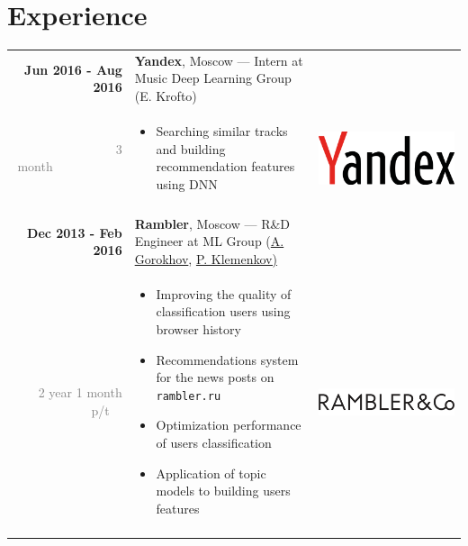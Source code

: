 \documentclass[a4paper,10pt]{article} %
\begin{document}
\section{Experience}

\begin{tabular}{r|p{11.5cm}c}
\textbf{Jun 2016 - Aug 2016}
 & \textbf{Yandex}, Moscow --- Intern at Music Deep Learning Group \footnotesize{(E. Krofto)} \\ 
\textcolor{gray}{3 month}~~~~~~~~~~~&  \footnotesize{
  
  \vspace{-0.25cm}
  \begin{itemize}
      \item Searching similar tracks and building recommendation features using DNN
  \end{itemize}
  \vspace{-0.3cm}
} 
& \multirow{2}{*}{\includegraphics[scale=0.02]{img/yandex}}\\
\multicolumn{2}{c}{}\\

\textbf{Dec 2013 - Feb 2016}
 & \textbf{Rambler}, Moscow --- R\&D Engineer at ML Group \footnotesize{(\href{https://ru.linkedin.com/in/anton-gorokhov-2959482}{A. Gorokhov}, \href{https://ru.linkedin.com/in/pavel-klemenkov-7a88a956}{P. Klemenkov)}}\\ 
\textcolor{gray}{2 year 1 month p/t}~~ &  \footnotesize{
  
  \vspace{-0.25cm}
  \begin{itemize}
      \item Improving the quality of classification users using browser history
  	  \item Recommendations system for the news posts on \texttt{rambler.ru}
      \item Optimization performance of users classification
      \item Application of topic models to building users features 
  \end{itemize}
  \vspace{-0.3cm}
} 
& \multirow{2}{*}{\includegraphics[scale=0.12]{img/ramblerco}}\\
\multicolumn{2}{c}{}\\


\end{tabular}
\end{document}
